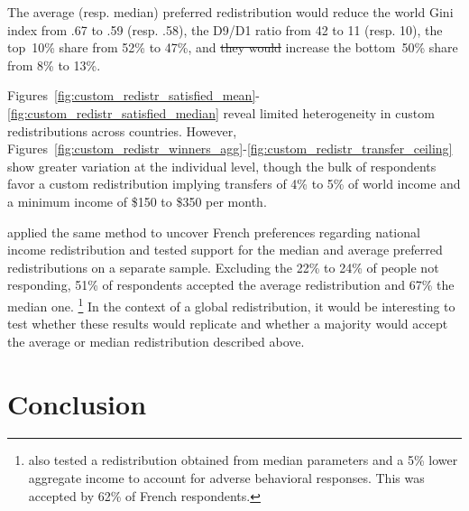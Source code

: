 \documentclass[12pt,english]{article}
\makeatletter
\providecommand{\DIFdeltex}[1]{{\protect\color{red}\sout{#1}}} %
\providecommand{\DIFdelbegin}{} %
\providecommand{\DIFdelend}{} %
\providecommand{\DIFdel}[1]{\texorpdfstring{\DIFdeltex{#1}}{}} %
\providecommand{\DIFscaledelfig}{0.5}
\newlength{\DIFdelgraphicswidth} %
\newlength{\DIFdelgraphicsheight} %
\providecommand{\DIFdelincludegraphics}[2][]{%
\sbox{\DIFdelgraphicsbox}{\DIFOincludegraphics[#1]{#2}}%
\settoboxwidth{\DIFdelgraphicswidth}{\DIFdelgraphicsbox} %
\settoboxtotalheight{\DIFdelgraphicsheight}{\DIFdelgraphicsbox} %
\scalebox{\DIFscaledelfig}{%
\parbox[b]{\DIFdelgraphicswidth}{\usebox{\DIFdelgraphicsbox}\\[-\baselineskip] \rule{\DIFdelgraphicswidth}{0em}}\llap{\resizebox{\DIFdelgraphicswidth}{\DIFdelgraphicsheight}{%
\setlength{\unitlength}{\DIFdelgraphicswidth}%
\begin{picture}(1,1)%
\thicklines\linethickness{2pt} %
{\color[rgb]{1,0,0}\put(0,0){\framebox(1,1){}}}%
{\color[rgb]{1,0,0}\put(0,0){\line( 1,1){1}}}%
{\color[rgb]{1,0,0}\put(0,1){\line(1,-1){1}}}%
\end{picture}%
}\hspace*{3pt}}} %
} %
\DeclareRobustCommand{\DIFdelbegin}{\DIFOdelbegin \let\includegraphics\DIFdelincludegraphics} %
\DeclareRobustCommand{\DIFdelend}{\DIFOaddend \let\includegraphics\DIFOincludegraphics} %
\let\sout@orig\sout %
\renewcommand{\sout}[1]{\ifmmode\text{\sout@orig{\ensuremath{#1}}}\else\sout@orig{#1}\fi} %
\makeatother
\begin{document}
The average (resp. median) preferred redistribution would reduce the world Gini index from .67 to .59 (resp. .58), the D9/D1 ratio from 42 to 11 (resp. 10), the top~10\% share from 52\% to 47\%, and \DIFdelbegin \DIFdel{they would }\DIFdelend increase the bottom~50\% share from 8\% to 13\%.

Figures~\ref{fig:custom_redistr_satisfied_mean}-\ref{fig:custom_redistr_satisfied_median} reveal limited heterogeneity in custom redistributions across countries. However, Figures~\ref{fig:custom_redistr_winners_agg}-\ref{fig:custom_redistr_transfer_ceiling} show greater variation at the individual level, though the bulk of respondents favor a custom redistribution implying transfers of 4\% to 5\% of world income and a minimum income of \$150 to \$350 per month. 

\cite{fabre_french_2022} applied the same method to uncover French preferences regarding national income redistribution and tested support for the median and average %
preferred redistributions on a separate sample. Excluding the 22\% to 24\% of people not responding, 51\% of respondents accepted the average redistribution and 67\% the median one.%
\footnote{\cite{fabre_french_2022} also tested a redistribution obtained from median parameters and a 5\% lower aggregate income to account for adverse behavioral responses. This was accepted by 62\% of French respondents.} 
In the context of a global redistribution, it would be interesting to test whether these results would replicate and whether a majority would accept the average or median redistribution described above. 

\section{Conclusion} %
\end{document}
